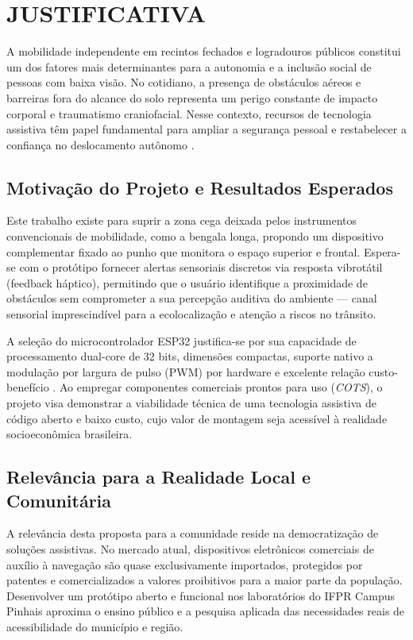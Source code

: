 \chapter{JUSTIFICATIVA}
\label{capitulo-justificativa-proposta}

A mobilidade independente em recintos fechados e logradouros públicos constitui um dos fatores mais determinantes para a autonomia e a inclusão social de pessoas com baixa visão. No cotidiano, a presença de obstáculos aéreos e barreiras fora do alcance do solo representa um perigo constante de impacto corporal e traumatismo craniofacial. Nesse contexto, recursos de tecnologia assistiva têm papel fundamental para ampliar a segurança pessoal e restabelecer a confiança no deslocamento autônomo \cite{bersch2017}.

\section{Motivação do Projeto e Resultados Esperados}
\label{sec:motivacao-esperada-proposta}

Este trabalho existe para suprir a zona cega deixada pelos instrumentos convencionais de mobilidade, como a bengala longa, propondo um dispositivo complementar fixado ao punho que monitora o espaço superior e frontal. Espera-se com o protótipo fornecer alertas sensoriais discretos via resposta vibrotátil (feedback háptico), permitindo que o usuário identifique a proximidade de obstáculos sem comprometer a sua percepção auditiva do ambiente --- canal sensorial imprescindível para a ecolocalização e atenção a riscos no trânsito.

A seleção do microcontrolador ESP32 justifica-se por sua capacidade de processamento dual-core de 32 bits, dimensões compactas, suporte nativo a modulação por largura de pulso (PWM) por hardware e excelente relação custo-benefício \cite{espressif2023esp32}. Ao empregar componentes comerciais prontos para uso (\textit{COTS}), o projeto visa demonstrar a viabilidade técnica de uma tecnologia assistiva de código aberto e baixo custo, cujo valor de montagem seja acessível à realidade socioeconômica brasileira.

\section{Relevância para a Realidade Local e Comunitária}
\label{sec:relevancia-local-proposta}

A relevância desta proposta para a comunidade reside na democratização de soluções assistivas. No mercado atual, dispositivos eletrônicos comerciais de auxílio à navegação são quase exclusivamente importados, protegidos por patentes e comercializados a valores proibitivos para a maior parte da população. Desenvolver um protótipo aberto e funcional nos laboratórios do IFPR Campus Pinhais aproxima o ensino público e a pesquisa aplicada das necessidades reais de acessibilidade do município e região.

